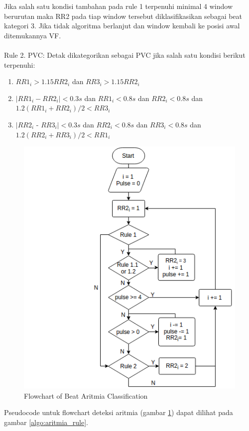 Jika salah satu kondisi tambahan pada rule 1 terpenuhi minimal 4 window berurutan maka RR2 pada tiap window tersebut diklasifikasikan sebagai beat kategori 3. Jika tidak algoritma berlanjut dan window kembali ke posisi awal ditemukannya VF.
\\
\\
Rule 2. PVC: Detak dikategorikan sebagai PVC jika salah satu kondisi berikut terpenuhi:

\begin{enumerate}
	\item $RR1_i > 1.15RR2_i$ dan $RR3_i > 1.15RR2_i$
	\item $|RR1_i - RR2_i| < 0.3s$ dan $RR1_i < 0.8s$ dan $RR2_i < 0.8s$ dan $1.2(RR1_i + RR2_i)/2 < RR3_i$
	\item $|RR2_i$ - $RR3_i| < 0.3s$ dan $RR2_i < 0.8s$ dan $RR3_i < 0.8s$ dan $1.2(RR2_i + RR3_i)/2 < RR1_i$
\end{enumerate}

\begin{figure}[htbp]
\centerline{\includegraphics[scale=0.65]{images/flowchart_aritmia.png}}
\caption{Flowchart of Beat Aritmia Classification}
\label{fig:flowchart_aritmia}
\end{figure}

Pseudocode untuk flowchart deteksi aritmia (gambar \ref{fig:flowchart_aritmia}) dapat dilihat pada gambar \ref{algo:aritmia_rule}.

